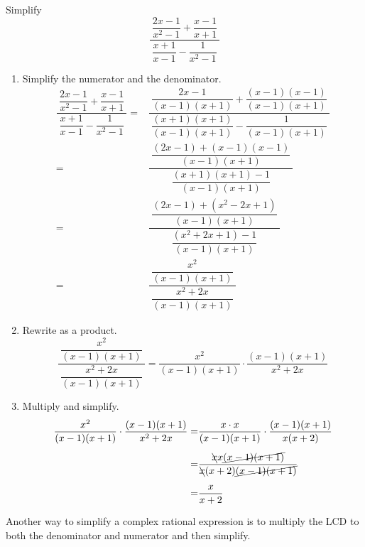 	\begin{example}
		Simplify \[
			\dfrac{~\dfrac{2x-1}{x^2-1}+\dfrac{x-1}{x+1}~}{~\dfrac{x+1}{x-1}-\dfrac{1}{x^2-1}~}
		\]

		\begin{enumerate}[label={\textbf{\textup{Step \arabic*.}}~}]
			\item Simplify the numerator and the denominator.
			      \[
				      \begin{split}
						  \dfrac{~\dfrac{2x-1}{x^2-1}+\dfrac{x-1}{x+1}~}{~\dfrac{x+1}{x-1}-\dfrac{1}{x^2-1}~}
						  =&\dfrac{
						      ~\dfrac{2x-1}{(x-1)(x+1)}+\dfrac{(x-1)(x-1)}{(x-1)(x+1)}~
					      }{~
						      \dfrac{(x+1)(x+1)}{(x-1)(x+1)}-\dfrac{1}{(x-1)(x+1)}~
					      }\\[5pt]
					      =&\dfrac{
						      ~\dfrac{(2x-1)+(x-1)(x-1)}{(x-1)(x+1)}~
					      }{
						      ~\dfrac{(x+1)(x+1)-1}{(x-1)(x+1)}~
					      }\\[5pt]
					      =&\dfrac{
						      ~\dfrac{(2x-1)+(x^2-2x+1)}{(x-1)(x+1)}~
					      }{
						      ~\dfrac{(x^2+2x+1)-1}{(x-1)(x+1)}~
					      }\\[5pt]
					      =&\dfrac{
						      ~\dfrac{x^2}{(x-1)(x+1)}~
					      }{
						      ~\dfrac{x^2+2x}{(x-1)(x+1)}~
					      }
				      \end{split}
			      \]
			\item Rewrite as a product.
			      \[
				      \dfrac{
					      ~\dfrac{x^2}{(x-1)(x+1)}~
				      }{
					      ~\dfrac{x^2+2x}{(x-1)(x+1)}~
				      }
				      =\dfrac{x^2}{(x-1)(x+1)}\cdot \dfrac{(x-1)(x+1)}{x^2+2x}
			      \]
			\item Multiply and simplify.
			      \[
					  \begin{aligned}
						\dfrac{x^2}{(x-1)(x+1)}\cdot \dfrac{(x-1)(x+1)}{x^2+2x}
						=&\dfrac{x\cdot x}{(x-1)(x+1)}\cdot \dfrac{(x-1)(x+1)}{x(x+2)}\\[5pt]
						=& \dfrac{\bcancel{x}x\cancel{(x-1)(x+1)}}{\bcancel{x}(x+2)\cancel{(x-1)(x+1)}}\\[5pt]
						=& \dfrac{x}{x+2}
					  \end{aligned}
			      \]
		\end{enumerate}
	\end{example}

	\begin{note}
		Another way to simplify a complex rational expression is to multiply the LCD to both the denominator and numerator and then simplify.
	\end{note}

